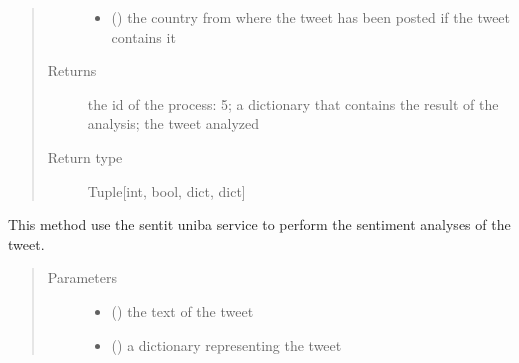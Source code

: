 \documentclass[letterpaper,10pt,english]{sphinxmanual}
\begin{document}
\begin{fulllineitems}
\begin{fulllineitems}
\begin{quote}
\begin{description}
\begin{itemize}
\item {} 
\sphinxAtStartPar
{} (\sphinxstyleliteralemphasis{\sphinxupquote{, }}) \textendash{} the country from where the tweet has been posted if the tweet contains it

\end{itemize}

\item[{Returns}] \leavevmode
\sphinxAtStartPar
the id of the process: 5; a dictionary that contains the result of the analysis; the tweet analyzed

\item[{Return type}] \leavevmode
\sphinxAtStartPar
Tuple{[}int, bool, dict, dict{]}

\end{description}\end{quote}

\end{fulllineitems}


\begin{fulllineitems}
\label{\detokenize{code_comment/tweet_processor:hate_tweet_map.tweets_processor.TweetProcessor.ProcessTweet.__link_entity}}
\sphinxAtStartPar
This method use the sent\sphinxhyphen{}it uniba service to perform the sentiment analyses of the tweet.
\begin{quote}\begin{description}
\item[{Parameters}] \leavevmode\begin{itemize}
\item {} 
\sphinxAtStartPar
{} () \textendash{} the text of the tweet

\item {} 
\sphinxAtStartPar
{} () \textendash{} a dictionary representing the tweet


\end{itemize}
\end{description}
\end{quote}
\end{fulllineitems}
\end{fulllineitems}
\end{document}
